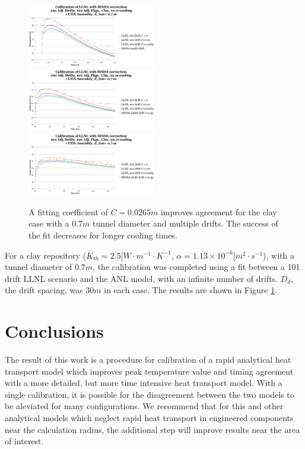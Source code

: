 \documentclass{anstrans}
\begin{document}
\begin{figure}[h!]
  \centering
    \includegraphics[width=0.5\textwidth]{100drift10yr.eps}
    \includegraphics[width=0.5\textwidth]{100drift25yr.eps}
    \includegraphics[width=0.5\textwidth]{100drift50yr.eps}
  \caption{A fitting coefficient of $C=0.0265m$ improves agreement for the clay 
  case with a $0.7m$ tunnel diameter and multiple drifts. The success of the fit 
  decreases for longer cooling times.}
  \label{fig:fit}
\end{figure}

For a clay repository ($K_{th} = 2.5 [W\cdot m^{-1}\cdot K^{-1}$, $\alpha = 
1.13\times10^{-6}[m^2\cdot s^{-1}$), with a tunnel diameter of $0.7m$, the 
calibration was completed using a fit between a 101 drift \gls{LLNL} scenario 
and the \gls{ANL} model, with an infinite number of drifts. $D_{d}$, the drift 
spacing, was $30m$ in each case. The results are shown in Figure \ref{fig:fit}.

\section{Conclusions}

The result of this work is a procedure for calibration of a rapid analytical 
heat transport model which improves peak temperature value and timing agreement 
with a more detailed, but more time intensive heat transport model. With a 
single calibration, it is possible for the disagreement between the two models to 
be aleviated for many configurations.  We recommend that for this and other 
analytical models which neglect rapid heat transport in engineered components 
near the calculation radius, the additional step will improve results near the 
area of interest.



\end{document}
